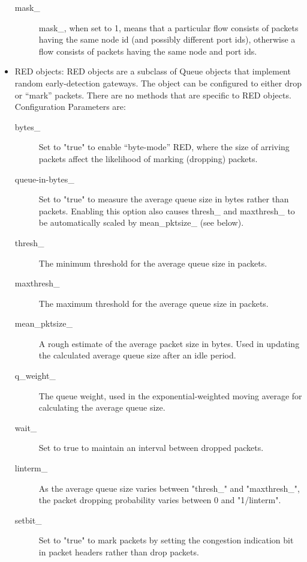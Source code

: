 \begin{itemize}
\begin{description}
\item[mask\_] mask\_, when set to 1, means that a particular flow consists
of packets having the same node id (and possibly different port ids),
otherwise a flow consists of packets having the same node and port ids. 
\end{description}

\item RED objects:
RED objects are a subclass of Queue objects that implement random
early-detection gateways. The object can be configured to either drop or
``mark'' packets. There are no methods that are specific to RED objects. 
Configuration Parameters are:
\begin{description}
\item[bytes\_] Set to "true" to enable ``byte-mode'' RED, where the size
of arriving packets affect the likelihood of marking (dropping) packets. 

\item[queue-in-bytes\_]
Set to "true" to measure the average queue size in bytes rather than
packets. Enabling this option also causes thresh\_ and maxthresh\_ to be
automatically scaled by mean\_pktsize\_ (see below). 

\item[thresh\_]
The minimum threshold for the average queue size in packets. 

\item[maxthresh\_]
The maximum threshold for the average queue size in packets. 

\item[mean\_pktsize\_]
A rough estimate of the average packet size in bytes. Used in updating the
calculated average queue size after an idle period. 

\item[q\_weight\_]
The queue weight, used in the exponential-weighted moving average for
calculating the average queue size. 

\item[wait\_]
Set to true to maintain an interval between dropped packets. 

\item[linterm\_]
As the average queue size varies between "thresh\_" and "maxthresh\_", the
packet dropping probability varies between 0 and "1/linterm". 

\item[setbit\_]
Set to "true" to mark packets by setting the congestion indication bit in
packet headers rather than drop packets. 


\end{description}
\end{itemize}
